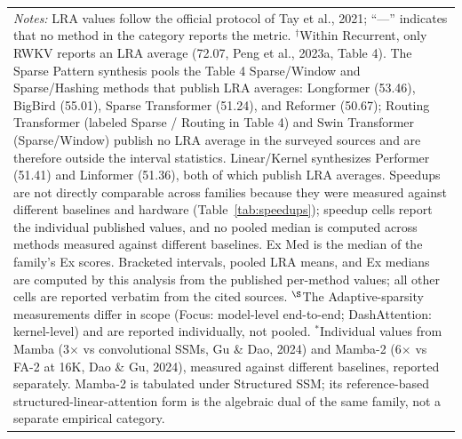 \documentclass[10pt,twocolumn]{article}
\begin{document}
\begin{table}[!tbp]
{\begin{tabular}{p{2.5cm}c p{2.3cm} p{3.0cm} c}
\multicolumn{5}{p{11.7cm}}{\scriptsize \textit{Notes:} LRA values follow the official protocol of Tay et al., 2021; ``---'' indicates that no method in the category reports the metric. $^\dagger$Within Recurrent, only RWKV reports an LRA average (72.07, Peng et al., 2023a, Table 4). The Sparse Pattern synthesis pools the Table 4 Sparse/Window and Sparse/Hashing methods that publish LRA averages: Longformer (53.46), BigBird (55.01), Sparse Transformer (51.24), and Reformer (50.67); Routing Transformer (labeled Sparse / Routing in Table 4) and Swin Transformer (Sparse/Window) publish no LRA average in the surveyed sources and are therefore outside the interval statistics. Linear/Kernel synthesizes Performer (51.41) and Linformer (51.36), both of which publish LRA averages. Speedups are not directly comparable across families because they were measured against different baselines and hardware (Table~\ref{tab:speedups}); speedup cells report the individual published values, and no pooled median is computed across methods measured against different baselines. Ex Med is the median of the family's Ex scores. Bracketed intervals, pooled LRA means, and Ex medians are computed by this analysis from the published per-method values; all other cells are reported verbatim from the cited sources. $^\S$The Adaptive-sparsity measurements differ in scope (Focus: model-level end-to-end; DashAttention: kernel-level) and are reported individually, not pooled. $^*$Individual values from Mamba (3$\times$ vs convolutional SSMs, Gu \& Dao, 2024) and Mamba-2 (6$\times$ vs FA-2 at 16K, Dao \& Gu, 2024), measured against different baselines, reported separately. Mamba-2 is tabulated under Structured SSM; its reference-based structured-linear-attention form is the algebraic dual of the same family, not a separate empirical category.}
\end{tabular}%
}
\end{table}
\end{document}
